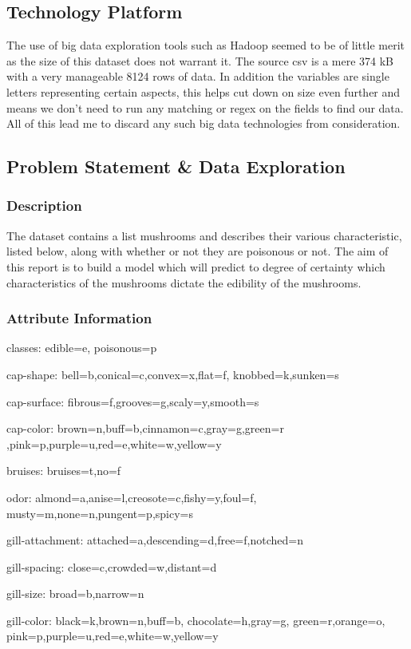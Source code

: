 \documentclass[10pt]{article}         %
\begin{document}
\subsection{Technology Platform}
The use of big data exploration tools such as Hadoop seemed to be of little merit as the size of this dataset does not warrant it. The source csv is a mere 374 kB with a very manageable 8124 rows of data. In addition the variables are single letters representing certain aspects, this helps cut down on size even further and means we don't need to run any matching or regex on the fields to find our data. All of this lead me to discard any such big data technologies from consideration.
\subsection{Problem Statement \& Data Exploration}
\subsubsection{Description}
The dataset contains a list mushrooms and describes their various characteristic, listed below, along with whether or not they are poisonous or not. The aim of this report is to build a model which will predict to degree of certainty which characteristics of the mushrooms dictate the edibility of the mushrooms.

\subsubsection{Attribute Information}

classes: edible=e, poisonous=p

cap-shape: bell=b,conical=c,convex=x,flat=f, knobbed=k,sunken=s

cap-surface: fibrous=f,grooves=g,scaly=y,smooth=s

cap-color: brown=n,buff=b,cinnamon=c,gray=g,green=r
,pink=p,purple=u,red=e,white=w,yellow=y

bruises: bruises=t,no=f

odor: almond=a,anise=l,creosote=c,fishy=y,foul=f,
musty=m,none=n,pungent=p,spicy=s

gill-attachment: attached=a,descending=d,free=f,notched=n

gill-spacing: close=c,crowded=w,distant=d

gill-size: broad=b,narrow=n

gill-color: black=k,brown=n,buff=b,
chocolate=h,gray=g, green=r,orange=o,
pink=p,purple=u,red=e,white=w,yellow=y
\end{document}
